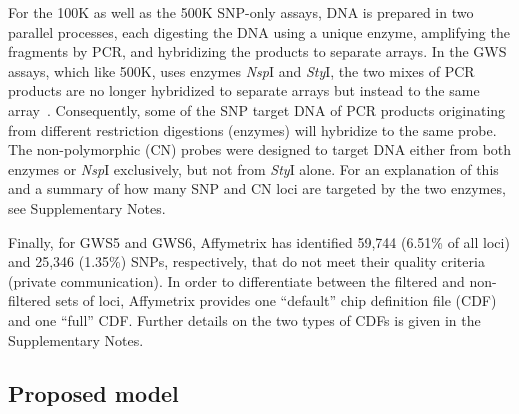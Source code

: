 \documentclass{bioinfo}
\newcommand{\GWSFive}{GWS5\xspace}
\newcommand{\GWSSix}{GWS6\xspace}
\newcommand{\NspI}{\emph{Nsp}I\xspace}
\newcommand{\StyI}{\emph{Sty}I\xspace}
\begin{document}
For the 100K as well as the 500K SNP-only assays, DNA is prepared in two parallel processes, each digesting the DNA using a unique enzyme, amplifying the fragments by PCR, and hybridizing the products to separate arrays.  In the GWS assays, which like 500K, uses enzymes \NspI and \StyI, the two mixes of PCR products are no longer hybridized to separate arrays but instead to the same array~\citep{Affymetrix_2007f, Affymetrix_2007g}.
Consequently, some of the SNP target DNA of PCR products originating from different restriction digestions (enzymes) will hybridize to the same probe.  
The non-polymorphic (CN) probes were designed to target DNA either from both enzymes or \NspI exclusively, but not from \StyI alone.  
For an explanation of this and a summary of how many SNP and CN loci are targeted by the two enzymes, see Supplementary Notes.


Finally, for \GWSFive and \GWSSix, Affymetrix has identified 59,744 (6.51\% of all loci) and 25,346 (1.35\%) SNPs, respectively, that do not meet their quality criteria (private communication).
In order to differentiate between the filtered and non-filtered sets of loci, Affymetrix provides one ``default'' chip definition file (CDF) and one ``full'' CDF.  Further details on the two types of CDFs is given in the Supplementary Notes.






\subsection{Proposed model}
\end{document}
